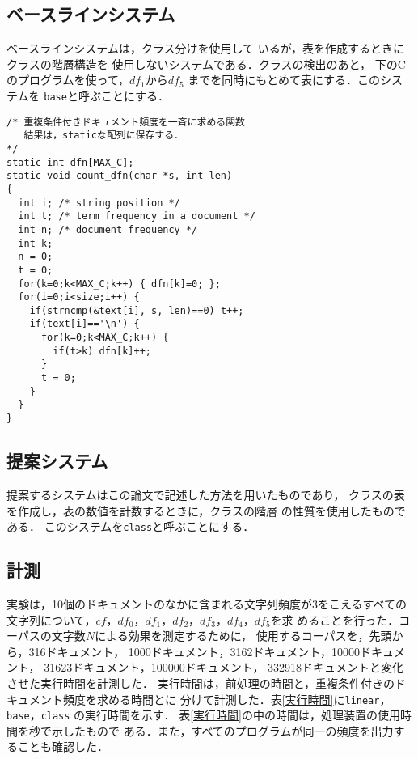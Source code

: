 \subsection{ベースラインシステム}

ベースラインシステムは，クラス分けを使用して
いるが，表を作成するときにクラスの階層構造を
使用しないシステムである．クラスの検出のあと，
下のCのプログラムを使って，$df_1$から$df_5$
までを同時にもとめて表にする．このシステムを
{\tt base}と呼ぶことにする．

\begin{verbatim}
/* 重複条件付きドキュメント頻度を一斉に求める関数
   結果は，staticな配列に保存する．
*/
static int dfn[MAX_C];
static void count_dfn(char *s, int len)
{ 
  int i; /* string position */
  int t; /* term frequency in a document */
  int n; /* document frequency */
  int k;
  n = 0;
  t = 0;
  for(k=0;k<MAX_C;k++) { dfn[k]=0; };
  for(i=0;i<size;i++) {
    if(strncmp(&text[i], s, len)==0) t++;
    if(text[i]=='\n') {
      for(k=0;k<MAX_C;k++) {
        if(t>k) dfn[k]++;
      }
      t = 0;
    }
  }
}
\end{verbatim}

\subsection{提案システム}

提案するシステムはこの論文で記述した方法を用いたものであり，
クラスの表を作成し，表の数値を計数するときに，クラスの階層
の性質を使用したものである．
このシステムを{\tt class}と呼ぶことにする．

\subsection{計測}

実験は，10個のドキュメントのなかに含まれる文字列頻度が3をこえるすべての
文字列について，$cf$，$df_0$，$df_1$，$df_2$，$df_3$，$df_4$，$df_5$を求
めることを行った．コーパスの文字数$N$による効果を測定するために，
使用するコーパスを，先頭から，316ドキュメント，
1000ドキュメント，3162ドキュメント，10000ドキュメント，
31623ドキュメント，100000ドキュメント，
332918ドキュメントと変化させた実行時間を計測した．
実行時間は，前処理の時間と，重複条件付きのドキュメント頻度を求める時間とに
分けて計測した．表\ref{実行時間}に{\tt linear}，{\tt base}，{\tt class}
の実行時間を示す．
表\ref{実行時間}の中の時間は，処理装置の使用時間を秒で示したもので
ある．また，すべてのプログラムが同一の頻度を出力することも確認した．

